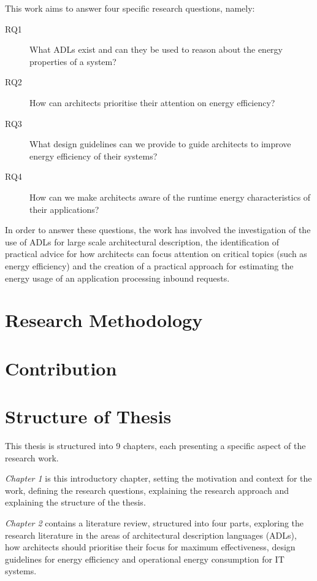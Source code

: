 This work aims to answer four specific research questions, namely:

\begin{description}
\item [RQ1] What ADLs exist and can they be used to reason about the energy properties of a system?
\item [RQ2] How can architects prioritise their attention on energy efficiency?
\item [RQ3] What design guidelines can we provide to guide architects to improve energy efficiency of their systems?
\item [RQ4] How can we make architects aware of the runtime energy characteristics of their applications?
\end{description}

In order to answer these questions, the work has involved the investigation of the use of ADLs for large scale architectural description, the identification of practical advice for how architects can focus attention on critical topics (such as energy efficiency) and the creation of a practical approach for estimating the energy usage of an application processing inbound requests.

\section{Research Methodology}

\section{Contribution}

\section{Structure of Thesis}

This thesis is structured into 9 chapters, each presenting a specific aspect of the research work.

\emph{Chapter 1} is this introductory chapter, setting the motivation and context for the work, defining the research questions, explaining the research approach and explaining the structure of the thesis.

\emph{Chapter 2} contains a literature review, structured into four parts, exploring the research literature in the areas of architectural description languages (ADLs), how architects should prioritise their focus for maximum effectiveness, design guidelines for energy efficiency and operational energy consumption for IT systems.

